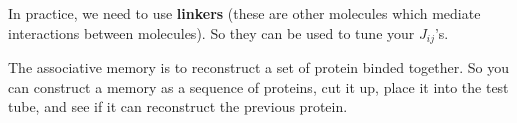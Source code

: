 In practice, we need to use \textbf{linkers} (these are other molecules which mediate interactions between molecules). So they can be used to tune your $J_{ij}$'s.

The associative memory is to reconstruct a set of protein binded together. So you can construct a memory as a sequence of proteins, cut it up, place it into the test tube, and see if it can reconstruct the previous protein.


















\newpage

